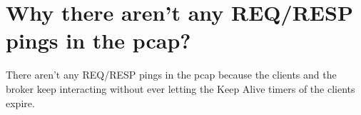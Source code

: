 \documentclass{article}
\begin{document}
\section{Why there aren’t any REQ/RESP pings in the pcap?}
There aren’t any REQ/RESP pings in the pcap because the clients and the broker keep interacting without ever
letting the Keep Alive timers of the clients expire.
\end{document}
